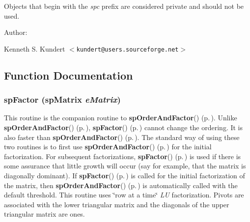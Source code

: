 Objects that begin with the {\em spc} prefix are considered private and should not be used.

\begin{Desc}
\item[Author: ]\par
 Kenneth S. Kundert $<${\tt kundert@users.sourceforge.net}$>$\end{Desc}


\subsection{Function Documentation}
\subsubsection{ sp\-Factor ({\bf sp\-Matrix} {\em e\-Matrix})}\label{spFactor_8c_a25}


This routine is the companion routine to {\bf sp\-Order\-And\-Factor}() {\rm (p.\,\pageref{spFactor_8c_a24})}. Unlike {\bf sp\-Order\-And\-Factor}() {\rm (p.\,\pageref{spFactor_8c_a24})}, {\bf sp\-Factor}() {\rm (p.\,\pageref{spFactor_8c_a25})} cannot change the ordering. It is also faster than {\bf sp\-Order\-And\-Factor}() {\rm (p.\,\pageref{spFactor_8c_a24})}. The standard way of using these two routines is to first use {\bf sp\-Order\-And\-Factor}() {\rm (p.\,\pageref{spFactor_8c_a24})} for the initial factorization. For subsequent factorizations, {\bf sp\-Factor}() {\rm (p.\,\pageref{spFactor_8c_a25})} is used if there is some assurance that little growth will occur (say for example, that the matrix is diagonally dominant). If {\bf sp\-Factor}() {\rm (p.\,\pageref{spFactor_8c_a25})} is called for the initial factorization of the matrix, then {\bf sp\-Order\-And\-Factor}() {\rm (p.\,\pageref{spFactor_8c_a24})} is automatically called with the default threshold. This routine uses \char`\"{}row at a time\char`\"{} {\em LU} factorization. Pivots are associated with the lower triangular matrix and the diagonals of the upper triangular matrix are ones.

